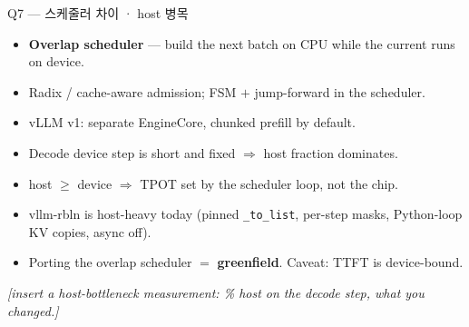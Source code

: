 \begin{frame}{Q7 — 스케줄러 차이 · host 병목}
  \begin{itemize}
    \item \textbf{Overlap scheduler} — build the next batch on CPU while the current runs on device.
    \item Radix / cache-aware admission; FSM $+$ jump-forward in the scheduler.
    \item vLLM v1: separate EngineCore, chunked prefill by default.
  \end{itemize}
  \begin{itemize}
    \item Decode device step is short and fixed $\Rightarrow$ host fraction dominates.
    \item host $\ge$ device $\Rightarrow$ TPOT set by the scheduler loop, not the chip.
    \item vllm-rbln is host-heavy today (pinned \texttt{\_to\_list}, per-step masks, Python-loop KV copies, async off).
    \item Porting the overlap scheduler $=$ \textbf{greenfield}. Caveat: TTFT is device-bound.
  \end{itemize}
  \footnotesize\emph{[insert a host-bottleneck measurement: \% host on the decode step, what you changed.]}
\end{frame}
